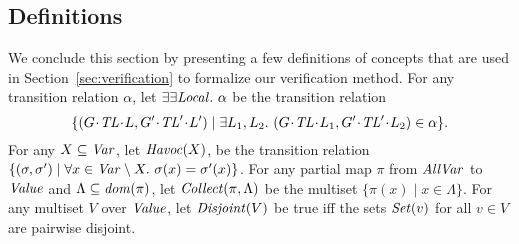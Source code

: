 \subsection{Definitions}
\label{sec:definitions}
We conclude this section by presenting a few definitions of concepts that are used in Section~\ref{sec:verification} to formalize
our verification method.
For any transition relation $\alpha$, let $\exists\exists {\mathit{Local}}.\ \alpha$ be the transition relation
\[\{(\MakeStore{\varsG}{\varsTL}{\varsL}, \MakeStore{\varsG'}{\varsTL'}{\varsL'}) \mid \exists \varsL_1,\varsL_2.\ (\MakeStore{\varsG}{\varsTL}{\varsL_1}, \MakeStore{\varsG'}{\varsTL'}{\varsL_2}) \in \alpha \}.\]
For any $X \subseteq \mathit{Var}$, let $\mathit{Havoc}(X)$, be the transition relation 
$\{(\sigma,\sigma') \mid \forall x \in \mathit{Var} \setminus X.\ \sigma(x) = \sigma'(x)\}$.
For any partial map $\pi$ from $\mathit{AllVar}$ to $\mathit{Value}$ and $\Lambda \subseteq \mathit{dom}(\pi)$, 
let $\mathit{Collect}(\pi, \Lambda)$ be the multiset $\{\pi(x) \mid x \in \Lambda\}$.
For any multiset $V$ over $\mathit{Value}$, let $\mathit{Disjoint}(V)$ be true iff the sets $\mathit{Set}(v)$ for all $v \in V$ are pairwise disjoint.

 


